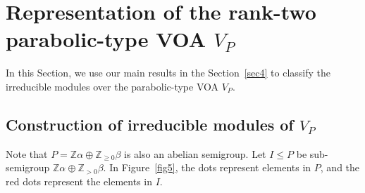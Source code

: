 \documentclass[12pt,a4paper,reqno]{amsart}
\numberwithin{equation}{section}
\numberwithin{equation}{section}
\theoremstyle{definition}
\newcommand{\Z}{\mathbb{Z}}
\def \al{\alpha}
\def \b {\beta}
\def \op {\oplus}
\begin{document}
	
	
	\section{Representation of the rank-two parabolic-type VOA $V_P$}	\label{sec:7}
	
	In this Section, we use our main results in the Section~\ref{sec4} to classify the irreducible modules over the parabolic-type VOA $V_P$.
	
	\subsection{Construction of irreducible modules of $V_P$}
	
	Note that $P=\Z\al\op \Z_{\geq 0}\b$ is also an abelian semigroup. Let $I\leq P$ be sub-semigroup $\Z \al\op \Z_{>0}\b$. In Figure~\ref{fig5}, the dots represent elements in $P$, and the red dots represent the elements in $I$. 
\end{document}
